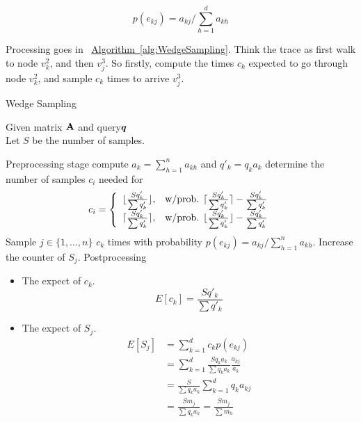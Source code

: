 \documentclass{article}
\newcommand{\V}[1]{{\bm{{\MakeLowercase{#1}}}}}%
\newcommand{\M}[1]{{\bm{\mathbf{\MakeUppercase{#1}}}}}%
\newcommand{\Alg}[1]{\hyperref[alg:#1]{Algorithm~\ref*{alg:#1}}}
\begin{document}
\[p(e_{kj}) = a_{kj}/\sum_{h=1}^{d}a_{kh}\]

Processing goes in ~\Alg{WedgeSampling}. Think the trace as first walk to node $v_k^2$, and then $v_j^3$. So firstly, compute the times $c_k$ expected to go through node $v_k^2$, and sample $c_k$ times to arrive $v_j^3$.
\begin{algorithm}[t]
    \caption{Wedge Sampling}
    \label{alg:WedgeSampling}
    Given  matrix $\M{A}$ and query$\V{q}$\\
    Let $S$ be the number of samples.
    \begin{algorithmic}[1]
    \State Preprocessing stage
    \State compute $a_k = \sum_{h=1}^{n}a_{kh}$ and $q'_k = q_ka_k$
    \EndFor
     determine the number of samples $c_i$ needed for
    \State
    \begin{equation*}c_i=
    \left\{
      \begin{array}{ll}
        \lfloor \frac{Sq'_k}{\sum q'_k} \rfloor,
        & \hbox{w/prob. $\lceil \frac{Sq'_k}{\sum q'_k} \rceil - \frac{Sq'_k}{\sum q'_k}$} \\
        \lceil \frac{Sq'_k}{\sum q'_k} \rceil,
        & \hbox{w/prob. $\lfloor \frac{Sq'_k}{\sum q'_k} \rfloor - \frac{Sq'_k}{\sum q'_k}$}
      \end{array}
    \right.
    \end{equation*}
    \EndFor
    \State  \label{line:edge}
    Sample $j\in \{1,\ldots,n\}$ $c_k$ times with probability
    $p(e_{kj}) = a_{kj}/\sum_{h=1}^{n}a_{kh}$.
    \State Increase the counter of $S_j$.
    \EndFor
    \State Postprocessing
    \end{algorithmic}
\end{algorithm}

\begin{itemize}
  \item The expect of $c_k$.
        \[ E[c_k] = \frac{Sq'_k}{\sum q'_k}\]
  \item The expect of $S_j$.
        \begin{align*}
        E[S_j] &= \sum_{k=1}^{d} c_kp(e_{kj})\\
               &= \sum_{k=1}^{d} \frac{Sq_ka_k}{\sum q_ka_k}\frac{a_{kj}}{a_k}\\
               &= \frac{S}{{\sum q_ka_k}}\sum_{k=1}^{d}q_ka_{kj}\\
               &= \frac{Sm_j}{{\sum q_ka_k}}= \frac{Sm_j}{{\sum m_h}}
        \end{align*}
\end{itemize}
\end{document}
